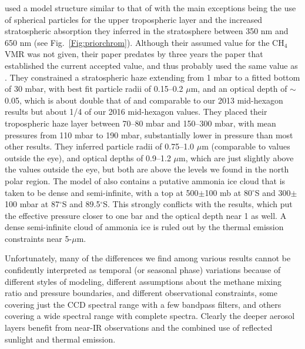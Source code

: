\documentclass[article,11pt]{emulateapj}
\def\degx{$^\circ$}
\def\mum{$\mu$m }
\def\mumx{$\mu$m}
\def\chf{CH$_4$ }
\begin{document}
\cite{Sanchez-Lavega2006} used a model structure similar to that of \cite{Perez-Hoyos2005}
with the main exceptions being the use of spherical particles for the upper tropospheric
layer and the increased stratospheric absorption they inferred in the
stratosphere between 350 nm and 650 nm (see Fig.\ \ref{Fig:priorchrom}).  
Although their assumed value for the \chf VMR was not given, their paper predates
by three years the \cite{Fletcher2009ch4saturn} paper that established the current 
accepted value, and thus probably used the same value as  \cite{Perez-Hoyos2005}.  
They constrained a stratospheric haze extending from 1 mbar to a fitted bottom
of 30  mbar, with best fit particle radii of 0.15--0.2 \mumx, and an optical depth
of $\sim$0.05, which is about double that of \cite{Sro2020spole} and comparable to
our 2013 mid-hexagon results but about 1/4 of our 2016 mid-hexagon values. 
They placed their tropospheric haze layer between 70--80 mbar and 150--300 mbar,
with mean pressures from 110 mbar to 190 mbar, substantially lower in pressure
 than most other results.  They inferred particle radii of 0.75--1.0 \mum (comparable
to \cite{Sro2020spole} values outside the eye), and
optical depths of 0.9--1.2 \mumx, which are just slightly above the \cite{Sro2020spole} values
outside the eye, but both are above the levels we found in the north
polar region. The model of \cite{Sanchez-Lavega2006} also contains a putative ammonia
ice cloud that is taken to be dense and semi-infinite, with a top at 500$\pm$100 mb
at 80\degx S and 300$\pm$100 mbar at 87\degx S and 89.5\degx S.  This strongly conflicts
with the \cite{Sro2020spole} results, which put the effective pressure closer
to one bar and the optical depth near 1 as well.  A dense semi-infinite cloud
of ammonia ice is ruled out by the thermal emission constraints near 5-\mumx.
  

Unfortunately, many of the differences we find among various results cannot be
confidently interpreted as temporal (or seasonal phase) variations because of different styles of modeling,
different assumptions about the methane mixing ratio and pressure boundaries, and different observational
constraints, some covering just the CCD spectral range with a few bandpass filters,
and others covering a wide spectral range with complete spectra.  Clearly the deeper
aerosol layers benefit from near-IR observations and the combined use of reflected
sunlight and thermal emission.
\end{document}
